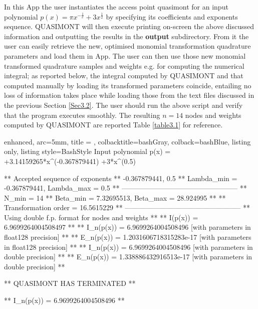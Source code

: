 \documentclass[a4paper, twosided]{book}
\begin{document}
\vspace{0.25cm}
\newpage

\noindent
In this App the user instantiates the access point \colorbox{poliGrayBlue}{quasimont} for an input polynomial $p(x) = \pi x^{-\frac{1}{e}} + 3 x^{\frac{1}{2}}$ by specifying its coefficients and exponents sequence. QUASIMONT will then execute printing on-screen the above discussed information and outputting the results in the \colorbox{poliGrayBlue}{\textbf{output}} subdirectory. From it the user can easily retrieve the new, optimised monomial transformation quadrature parameters and load them in \colorbox{poliGrayBlue}{App}. The user can then use those new monomial transformed quadrature samples and weights e.g. for computing the numerical integral; as reported below, the integral computed by QUASIMONT and that computed manually by loading its transformed parameters coincide, entailing no loss of information takes place while loading those from the text files discussed in the previous Section \ref{Sec3.2}. The user should run the above script and verify that the program executes smoothly. The resulting $n=14$ nodes and weights computed by QUASIMONT are reported Table \ref{table3.1} for reference.

\vspace{0.5cm}
\begin{tcblisting}{enhanced,
                   arc=5mm,
                   title = \color{black}{\large \ttfamily Execution of external source code using QUASIMONT' static library},
                   colbacktitle=bashGray,
                   colback=bashBlue,
                   listing only,
                   listing style=BashStyle}
 Input polynomial p(x) =  +3.14159265*x^(-0.367879441) +3*x^(0.5)

 ** Accepted sequence of exponents ** 
    {-0.367879441, 0.5}
 ** Lambda_min = -0.367879441, Lambda_max = 0.5 **
 --------------------------------------------------
 ** N_min = 14
 ** Beta_min = 7.32695513, Beta_max = 28.924995 **
 ** Transformation order = 16.5615229 **
 --------------------------------------------------
 ** Using double f.p. format for nodes and weights **
 ** I(p(x))   = 6.9699264004508497 **
 ** I_n(p(x)) = 6.9699264004508496      [with parameters in float128 precision] **
 ** E_n(p(x)) = 1.2031606718315283e-17  [with parameters in float128 precision] **
 ** I_n(p(x)) = 6.9699264004508496      [with parameters in double precision] **
 ** E_n(p(x)) = 1.338886432916513e-17   [with parameters in double precision] **

 ** QUASIMONT HAS TERMINATED **

 ** I_n(p(x)) = 6.9699264004508496 **
\end{tcblisting}
\end{document}
